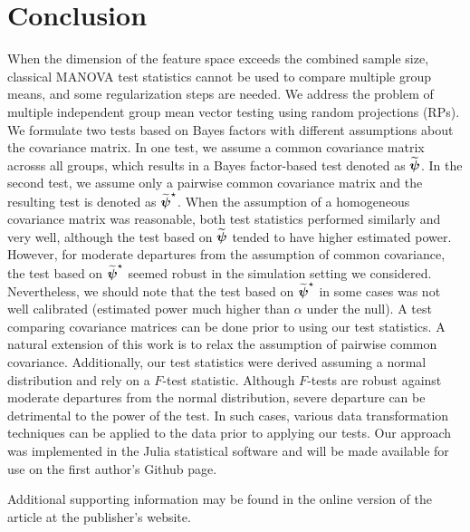 \documentclass[pdflatex,sn-basic]{sn-jnl}%
\def\boldpsi{{\mbox{\boldmath $\psi$}}}
\theoremstyle{thmstyleone}%
\theoremstyle{thmstyletwo}%
\theoremstyle{thmstylethree}%
\begin{document}
\section{Conclusion} \label{sec:conclusion}
When the dimension of the feature space exceeds the combined sample size, classical MANOVA test statistics cannot be used to compare multiple group means, and some regularization steps are needed. We address the problem of multiple independent group mean vector testing using random projections (RPs). We formulate two tests based on Bayes factors with different assumptions about the covariance matrix. In one test, we assume a common covariance matrix acrosss all groups, which results in a Bayes factor-based test denoted as $\widetilde{\boldpsi}$. In the second test, we assume only a pairwise common covariance matrix and the resulting test is denoted as $\widetilde{\boldpsi}^{\star}$. When the assumption of a homogeneous covariance matrix was reasonable, both test statistics performed similarly and very well, although the test based on $\widetilde{\boldpsi}$ tended to have higher estimated power. However, for moderate departures from the assumption of common covariance, the test based on $\widetilde{\boldpsi}^{\star}$ seemed robust in the simulation setting we considered. Nevertheless, we should note that the test based on $\widetilde{\boldpsi}^{\star}$ in some cases was not well calibrated (estimated power much higher than $\alpha$ under the null). A test comparing covariance matrices can be done prior to using our test statistics.  A natural extension of this work is to relax the assumption of pairwise common covariance. Additionally, our test statistics were derived assuming a normal distribution and rely on a $F$-test statistic. Although $F$-tests are robust against moderate departures from the normal distribution, severe departure can be detrimental to the power of the test. In such cases, various data transformation techniques can be applied to the data prior to applying our tests. Our approach was implemented in the \textsf{Julia} \citep{bezanson2012julia} statistical software and will be made available for use on the first author's Github page.   


\backmatter

Additional supporting information may be found in the
online version of the article at the publisher’s website.

\end{document}
